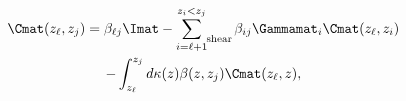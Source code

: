 \begin{multline}
\Cmat(z_\ell, z_j) = \beta_{\ell j}\Imat - \sum\limits_{i =\ell +1}^{z_i < z_j}\mathop{}_{\mkern-5mu \rm{shear}} \beta_{ij} \Gammamat_i \Cmat(z_\ell, z_i) \\
- \int_{z_\ell}^{z_j} d\kappa(z) \beta(z, z_j) \Cmat(z_\ell, z),
\end{multline}